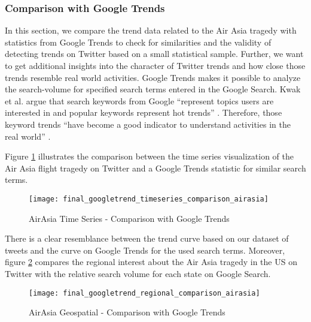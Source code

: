 \subsubsection{Comparison with Google Trends}
In this section, we compare the trend data related to the Air Asia tragedy with statistics from Google Trends to check for similarities and the validity of detecting trends on Twitter based on a small statistical sample. Further, we want to get additional insights into the character of Twitter trends and how close those trends resemble real world activities. Google Trends makes it possible to analyze the search-volume for specified search terms entered in the Google Search. Kwak et al. argue that search keywords from Google \enquote{represent topics users are interested in and popular keywords represent hot trends} \cite[6]{kwak2010what}. Therefore, those keyword trends \enquote{have become a good indicator to understand activities in the real world} \cite[6]{kwak2010what}.

Figure \ref{fig:google-trends-comparison-timeseries} illustrates the comparison between the time series visualization of the Air Asia flight tragedy on Twitter and a Google Trends statistic for similar search terms. 

\begin{figure}[H]
  \centering
        \texttt{[image: final\_googletrend\_timeseries\_comparison\_airasia]}
  \caption[AirAsia Time Series - Comparison with Google Trends]{AirAsia Time Series - Comparison with Google Trends}
  \label{fig:google-trends-comparison-timeseries}
  \vspace{-1.3em}
\end{figure}

There is a clear resemblance between the trend curve based on our dataset of tweets and the curve on Google Trends for the used search terms. Moreover, figure \ref{fig:google-trends-comparison-geospatial} compares the regional interest about the Air Asia tragedy in the US on Twitter with the relative search volume for each state on Google Search. 

\begin{figure}[H]
  \centering
        \texttt{[image: final\_googletrend\_regional\_comparison\_airasia]}
  \caption[AirAsia Geospatial - Comparison with Google Trends]{AirAsia Geospatial - Comparison with Google Trends}
  \label{fig:google-trends-comparison-geospatial}
  \vspace{-1.3em}
\end{figure}

